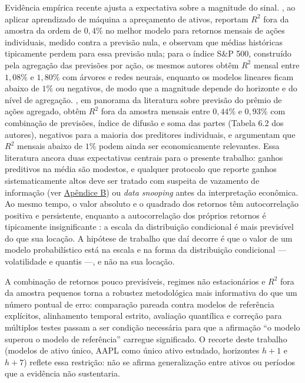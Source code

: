 Evidência empírica recente ajusta a expectativa sobre a magnitude do sinal. , ao aplicar aprendizado de máquina a apreçamento de ativos, reportam \(R^2\) fora da amostra da ordem de \(0{,}4\%\) no melhor modelo para retornos mensais de ações individuais, medido contra a previsão nula, e observam que médias históricas tipicamente perdem para essa previsão nula; para o índice S\&P 500, construído pela agregação das previsões por ação, os mesmos autores obtêm \(R^2\) mensal entre \(1{,}08\%\) e \(1{,}80\%\) com árvores e redes neurais, enquanto os modelos lineares ficam abaixo de \(1\%\) ou negativos, de modo que a magnitude depende do horizonte e do nível de agregação. , em panorama da literatura sobre previsão do prêmio de ações agregado, obtêm \(R^2\) fora da amostra mensais entre \(0{,}44\%\) e \(0{,}93\%\) com combinação de previsões, índice de difusão e soma das partes (Tabela 6.2 dos autores), negativos para a maioria dos preditores individuais, e argumentam que \(R^2\) mensais abaixo de \(1\%\) podem ainda ser economicamente relevantes. Essa literatura ancora duas expectativas centrais para o presente trabalho: ganhos preditivos na média são modestos, e qualquer protocolo que reporte ganhos sistematicamente altos deve ser tratado com suspeita de vazamento de informação (ver \hyperref[gl:leakage]{Apêndice B}) ou \textit{data snooping} antes da interpretação econômica. Ao mesmo tempo, o valor absoluto e o quadrado dos retornos têm autocorrelação positiva e persistente, enquanto a autocorrelação dos próprios retornos é tipicamente insignificante \cite{CONT2001}: a escala da distribuição condicional é mais previsível do que sua locação. A hipótese de trabalho que daí decorre é que o valor de um modelo probabilístico está na escala e na forma da distribuição condicional --- volatilidade e quantis ---, e não na sua locação.

A combinação de retornos pouco previsíveis, regimes não estacionários e \(R^2\) fora da amostra pequenos torna a robustez metodológica mais informativa do que um número pontual de erro: comparação pareada contra modelos de referência explícitos, alinhamento temporal estrito, avaliação quantílica e correção para múltiplos testes passam a ser condição necessária para que a afirmação ``o modelo superou o modelo de referência'' carregue significado. O recorte deste trabalho (modelos de ativo único, AAPL como único ativo estudado, horizontes \(h+1\) e \(h+7\)) reflete essa restrição: não se afirma generalização entre ativos ou períodos que a evidência não sustentaria.

